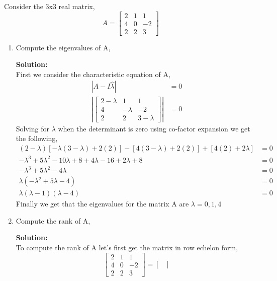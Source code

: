 \documentclass[12pt]{article}
\makeatletter
\theoremstyle{homework}
\newenvironment{exercise}[1]
{\def\@currentlabel{#1}\exercisecore}
{\endexercisecore}
\newcommand{\localhead}[1]{\par\smallskip\noindent\textbf{#1}\nobreak\\}%
\newcommand\solution{\localhead{Solution:}}
\makeatother
\begin{document}
\begin{exercise}{1} Consider the 3x3 real matrix, 
    \begin{equation*}
       A =  \begin{bmatrix}
            2& 1& 1 \\
            4 & 0 & -2 \\
            2 & 2 & 3 
        \end{bmatrix}
    \end{equation*}
\begin{enumerate}
    \item Compute the eigenvalues of A,
    \solution First we consider the characteristic equation of A, 
    \begin{align*}
        |A - I\hat{\lambda}| &= 0\\
       |\begin{bmatrix}
            2-\lambda& 1& 1 \\
            4 & -\lambda & -2 \\
            2 & 2 & 3-\lambda 
        \end{bmatrix}|&= 0
    \end{align*}
    Solving for $\lambda$ when the determinant is zero using co-factor expansion we get the following, 
    \begin{align*}
        (2-\lambda)[-\lambda(3-\lambda) + 2(2)] - [4(3 - \lambda) + 2(2)] + [4(2) + 2\lambda] &= 0\\
        -\lambda^3+5\lambda^2-10\lambda+8 +4\lambda - 16 + 2\lambda + 8 &= 0 \\
        -\lambda^3+5\lambda^2-4\lambda &= 0\\
        \lambda(-\lambda^2+5\lambda-4) &= 0\\
        \lambda(\lambda - 1)(\lambda - 4) &= 0
    \end{align*}
    Finally we get that the eigenvalues for the matrix A are $\lambda = 0, 1, 4$
    \vspace{.25in}
    \item Compute the rank of A,
    \solution To compute the rank of A let's first get the matrix in row echelon form, 
    \begin{equation*}
        \begin{bmatrix}
            2& 1& 1 \\
            4 & 0 & -2 \\
            2 & 2 & 3 
        \end{bmatrix} = 
        \begin{bmatrix}

\end{bmatrix}
\end{equation*}
\end{enumerate}
\end{exercise}
\end{document}
